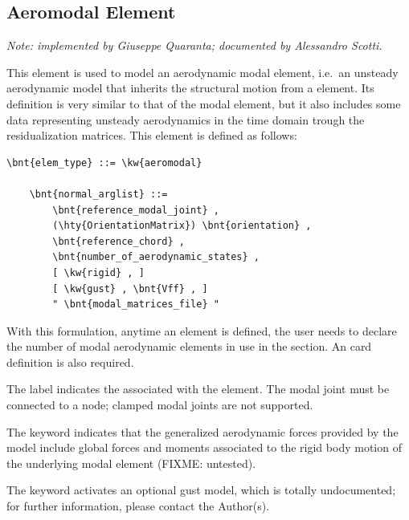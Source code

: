 \subsection{Aeromodal Element}
\emph{Note: implemented by Giuseppe Quaranta; documented by Alessandro Scotti.}

\noindent
This element is used to model an aerodynamic modal element,
i.e.\ an unsteady aerodynamic model that inherits the structural
motion from a  element.
Its definition is very similar to that of the modal element,
but it also includes some data representing unsteady aerodynamics
in the time domain trough the residualization matrices.
This element is defined as follows:
\begin{Verbatim}[commandchars=\\\{\}]
    \bnt{elem_type} ::= \kw{aeromodal}

    \bnt{normal_arglist} ::=
        \bnt{reference_modal_joint} ,
        (\hty{OrientationMatrix}) \bnt{orientation} ,
        \bnt{reference_chord} ,
        \bnt{number_of_aerodynamic_states} ,
        [ \kw{rigid} , ]
        [ \kw{gust} , \bnt{Vff} , ]
        " \bnt{modal_matrices_file} "
\end{Verbatim}
With this formulation, anytime an  element is defined,
the user needs to declare the number of modal aerodynamic elements
in use in the  section.
An 
card definition is also required.

The label  indicates
the 
associated with the  element.
The modal joint must be connected to a  node;
clamped modal joints are not supported.

The keyword  indicates that the generalized aerodynamic forces
provided by the model include global forces and moments associated
to the rigid body motion of the underlying modal element (FIXME: untested).

The keyword  activates an optional gust model,
which is totally undocumented;
for further information, please contact the Author(s).

